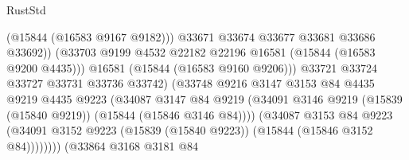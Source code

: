 \begin{lexlean}{RustStd}
\begin{coremodule}
                                              (@15844 (@16583 @9167 @9182)))
                                            @33671
                                            @33674
                                            @33677
                                            @33681
                                            @33686
                                            @33692))
                                        (@33703
                                          @9199
                                          @4532
                                          @22182
                                          @22196
                                          @16581
                                          (@15844 (@16583 @9200 @4435)))
                                        @16581
                                        (@15844 (@16583 @9160 @9206)))
                                      @33721
                                      @33724
                                      @33727
                                      @33731
                                      @33736
                                      @33742)
                                    (@33748
                                      @9216
                                      @3147
                                      @3153
                                      @84
                                      @4435
                                      @9219
                                      @4435
                                      @9223
                                      (@34087
                                        @3147
                                        @84
                                        @9219
                                        (@34091
                                          @3146
                                          @9219
                                          (@15839 (@15840 @9219))
                                          (@15844 (@15846 @3146 @84))))
                                      (@34087
                                        @3153
                                        @84
                                        @9223
                                        (@34091
                                          @3152
                                          @9223
                                          (@15839 (@15840 @9223))
                                          (@15844 (@15846 @3152 @84))))))))
                              (@33864
                                @3168
                                @3181
                                @84

\end{coremodule}
\end{lexlean}
